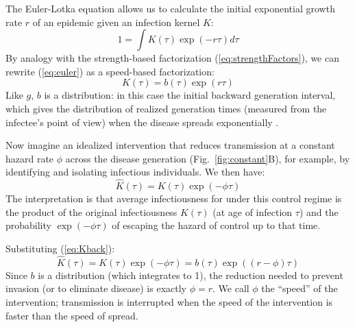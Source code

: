 \documentclass[12pt]{article}
\newcommand{\figref}[1]{Fig.~\ref{fig:#1}}
\newcommand{\eqref}[1]{(\ref{eq:#1})}
\newcommand{\eqlab}[1]{\label{eq:#1}}
\begin{document}
The Euler-Lotka equation allows us to calculate the initial exponential growth rate $r$ of an epidemic given an infection kernel $K$:
\begin{equation}
	1 = \int K(\tau) \exp(-r\tau) d\tau
	\eqlab{euler}
\end{equation}
By analogy with the strength-based factorization \eqref{strengthFactors}, we can rewrite \eqref{euler} as a speed-based factorization:
\begin{equation}
K(\tau) = b(\tau)\exp(r\tau)
\eqlab{Kback}
\end{equation}
Like $g$, $b$ is a distribution: in this case the initial backward generation interval, which gives the distribution of realized generation times (measured from the infectee's point of view) when the disease spreads exponentially \citep{champredon2015intrinsic, britton2019estimation}.

Now imagine an idealized intervention that reduces transmission at a constant hazard rate $\phi$ across the disease generation (\figref{constant}B), for example, by identifying and isolating infectious individuals.
We then have:
\begin{equation}
	\hat K(\tau) = K(\tau)\exp(-\phi\tau)
\end{equation}
The interpretation is that average infectiousness for under this control regime is the product of the original infectiousness $K(\tau)$ (at age of infection $\tau$) and the probability $\exp(-\phi\tau)$ of escaping the hazard of control up to that time.

Substituting \eqref{Kback}:
\begin{equation}
	\hat K(\tau) = K(\tau)\exp(-\phi\tau) = b(\tau)\exp((r-\phi)\tau)
\end{equation}
Since $b$ is a distribution (which integrates to 1), the reduction needed to prevent invasion (or to eliminate disease) is exactly $\phi=r$. 
We call $\phi$ the ``speed'' of the intervention; transmission is interrupted when the speed of the intervention is faster than the speed of spread.
\end{document}
